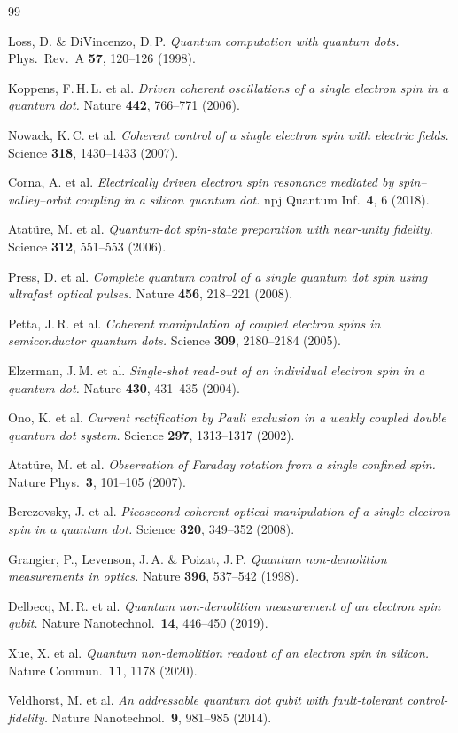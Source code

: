 \begin{thebibliography}{99}

Loss, D. \& DiVincenzo, D.\,P.
\textit{Quantum computation with quantum dots.}
Phys.\ Rev.\ A \textbf{57}, 120--126 (1998).

Koppens, F.\,H.\,L. et al.
\textit{Driven coherent oscillations of a single electron spin in a quantum dot.}
Nature \textbf{442}, 766--771 (2006).

Nowack, K.\,C. et al.
\textit{Coherent control of a single electron spin with electric fields.}
Science \textbf{318}, 1430--1433 (2007).

Corna, A. et al.
\textit{Electrically driven electron spin resonance mediated by
spin--valley--orbit coupling in a silicon quantum dot.}
npj Quantum Inf.\ \textbf{4}, 6 (2018).

Atatüre, M. et al.
\textit{Quantum-dot spin-state preparation with near-unity fidelity.}
Science \textbf{312}, 551--553 (2006).

Press, D. et al.
\textit{Complete quantum control of a single quantum dot spin using
ultrafast optical pulses.}
Nature \textbf{456}, 218--221 (2008).

Petta, J.\,R. et al.
\textit{Coherent manipulation of coupled electron spins in semiconductor
quantum dots.}
Science \textbf{309}, 2180--2184 (2005).

Elzerman, J.\,M. et al.
\textit{Single-shot read-out of an individual electron spin in a quantum dot.}
Nature \textbf{430}, 431--435 (2004).

Ono, K. et al.
\textit{Current rectification by Pauli exclusion in a weakly coupled
double quantum dot system.}
Science \textbf{297}, 1313--1317 (2002).

Atatüre, M. et al.
\textit{Observation of Faraday rotation from a single confined spin.}
Nature Phys.\ \textbf{3}, 101--105 (2007).

Berezovsky, J. et al.
\textit{Picosecond coherent optical manipulation of a single electron spin in a
quantum dot.}
Science \textbf{320}, 349--352 (2008).

Grangier, P., Levenson, J.\,A. \& Poizat, J.\,P.
\textit{Quantum non-demolition measurements in optics.}
Nature \textbf{396}, 537--542 (1998).

Delbecq, M.\,R. et al.
\textit{Quantum non-demolition measurement of an electron spin qubit.}
Nature Nanotechnol.\ \textbf{14}, 446--450 (2019).

Xue, X. et al.
\textit{Quantum non-demolition readout of an electron spin in silicon.}
Nature Commun.\ \textbf{11}, 1178 (2020).

Veldhorst, M. et al.
\textit{An addressable quantum dot qubit with fault-tolerant control-fidelity.}
Nature Nanotechnol.\ \textbf{9}, 981--985 (2014).

\end{thebibliography}
